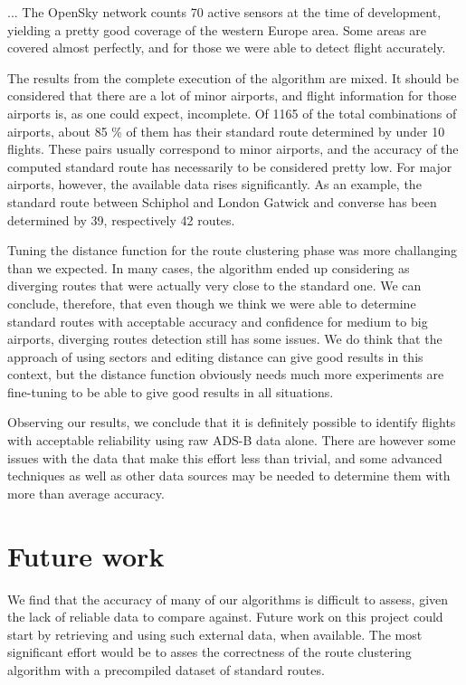 \documentclass{vldb}
\begin{document}
... The OpenSky network counts 70 active sensors at the time of development,
yielding a pretty good coverage of the western Europe area. Some areas are
covered almost perfectly, and for those we were able to detect flight accurately.

The results from the complete execution of the algorithm are mixed.
It should be considered that there are a lot of minor airports, and flight
information for those airports is, as one could expect, incomplete.
Of 1165 of the total combinations of airports, about 85 \% of them has their
standard route determined by under 10 flights. These pairs usually correspond
to minor airports, and the accuracy of the computed standard route has
necessarily to be considered pretty low. For major airports, however, the
available data rises significantly. As an example, the standard route between
Schiphol and London Gatwick and converse has been determined by 39,
respectively 42 routes.

Tuning the distance function for the route clustering phase was more challanging
than we expected. In many cases, the algorithm ended up considering as diverging
routes that were actually very close to the standard one. We can conclude,
therefore, that even though we think we were able to determine standard routes
with acceptable accuracy and confidence for medium to big airports, diverging
routes detection still has some issues. We do think that the approach of using
sectors and editing distance can give good results in this context, but the
distance function obviously needs much more experiments are fine-tuning to be
able to give good results in all situations.

Observing our results, we conclude that it is definitely possible to
identify flights with acceptable reliability using raw ADS-B data alone. There
are however some issues with the data that make this effort less than
trivial, and some advanced techniques as well as other data sources may be
needed to determine them with more than average accuracy.

\section{Future work}

We find that the accuracy of many of our algorithms is difficult to assess,
given the lack of reliable data to compare against. Future work on this project
could start by retrieving and using such external data, when available. The most
significant effort would be to asses the correctness of the route clustering
algorithm with a precompiled dataset of standard routes.
\end{document}
